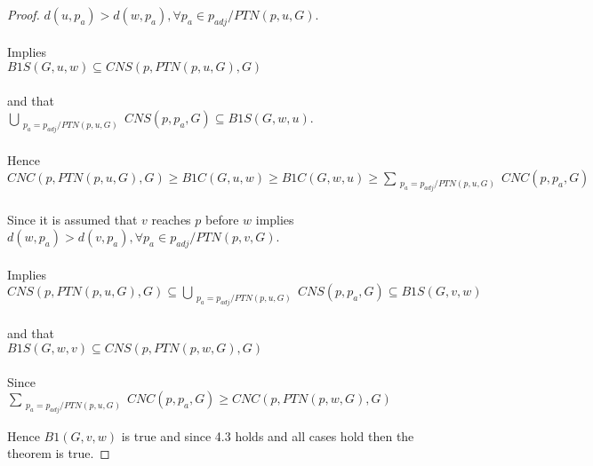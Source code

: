 \documentclass{article}
\begin{document}
\begin{proof}
\(d(u,p_a) > d(w,p_a), \forall p_a \in p_{adj}/PTN(p,u,G)\).
\\\\
Implies
\\

\(B1S(G,u,w) \subseteq CNS(p,PTN(p,u,G),G)\) 
\\\\
and that 
\\

\(\bigcup_{\substack{p_a = p_{adj}/PTN(p, u, G)}} CNS(p,p_a,G) \subseteq  B1S(G,w,u)\).
\\\\
Hence
\\

\(CNC(p,PTN(p,u,G),G) \ge B1C(G,u,w) \ge B1C(G,w,u) \ge \sum_{\substack{p_a=p_{adj}/PTN(p,u,G)}} CNC(p,p_a,G) \)
\\\\
Since it is assumed that \(v\) reaches \(p\) before \(w\) implies
\\

\(d(w,p_a) > d(v,p_a), \forall p_a \in p_{adj}/PTN(p,v,G)\).
\\\\
Implies
\\

\( CNS(p,PTN(p,u,G),G) \subseteq \bigcup_{\substack{p_a = p_{adj}/PTN(p, u, G)}} CNS(p,p_a,G) \subseteq B1S(G,v,w)\)
\\\\
and that
\\
\(B1S(G,w,v) \subseteq CNS(p,PTN(p,w,G),G)\) 
\\\\
Since
\\

\(\sum_{\substack{p_a=p_{adj}/PTN(p,u,G)}} CNC(p,p_a,G) \ge CNC(p,PTN(p,w,G),G) \)


Hence \(B1(G,v,w)\) is true and since 4.3 holds and all cases hold then the theorem is true.
\end{proof}
\end{document}
